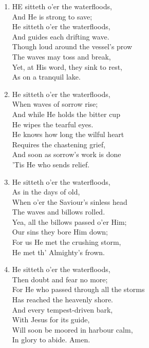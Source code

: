 \documentclass[11pt,a4paper]{article}
\begin{document}
\begin{enumerate}
    \item HE sitteth o'er the waterfloods, \\
        And He is strong to save; \\
        He sitteth o'er the waterfloods, \\
        And guides each drifting wave. \\
        Though loud around the vessel's prow \\
        The waves may toss and break, \\
        Yet, at His word, they sink to rest, \\
        As on a tranquil lake.

    \item He sitteth o'er the waterfloods, \\
        When waves of sorrow rise; \\
        And while He holds the bitter cup \\
        He wipes the tearful eyes. \\
        He knows how long the wilful heart \\
        Requires the chastening grief, \\
        And soon as sorrow's work is done \\
        'Tis He who sends relief.

    \item He sitteth o'er the waterfloods, \\
        As in the days of old, \\
        When o'er the Saviour's sinless head \\
        The waves and billows rolled. \\
        Yea, all the billows passed o'er Him; \\
        Our sins they bore Him down; \\
        For us He met the crushing storm, \\
        He met th' Almighty's frown.

    \item He sitteth o'er the waterfloods, \\
        Then doubt and fear no more; \\
        For He who passed through all the storms \\
        Has reached the heavenly shore. \\
        And every tempest-driven bark, \\
        With Jesus for its guide, \\
        Will soon be moored in harbour calm, \\
        In glory to abide. Amen.

\end{enumerate}
\end{document}
